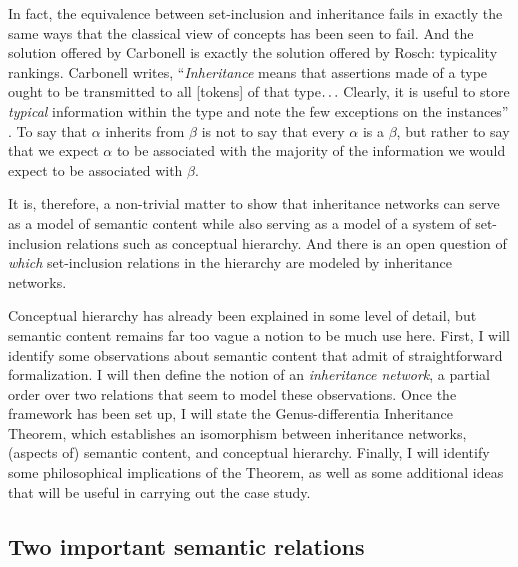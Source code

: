In fact, the equivalence between set-inclusion and inheritance fails in exactly the same ways that the classical view of concepts has been seen to fail. And the solution offered by Carbonell is exactly the solution offered by Rosch: typicality rankings. Carbonell writes, ``\emph{Inheritance} means that assertions made of a type ought to be transmitted to all [tokens] of that type$\mathellipsis$ Clearly, it is useful to store \emph{typical} information within the type and note the few exceptions on the instances'' \cite{carbonell_default_1980}. To say that $\alpha$ inherits from $\beta$ is not to say that every $\alpha$ is a $\beta$, but rather to say that we expect $\alpha$ to be associated with the majority of the information we would expect to be associated with $\beta$.

It is, therefore, a non-trivial matter to show that inheritance networks can serve as a model of semantic content while also serving as a model of a system of set-inclusion relations such as conceptual hierarchy. And there is an open question of \emph{which} set-inclusion relations in the hierarchy are modeled by inheritance networks.

Conceptual hierarchy has already been explained in some level of detail, but semantic content remains far too vague a notion to be much use here. First, I will identify some observations about semantic content that admit of straightforward formalization. I will then define the notion of an \emph{inheritance network}, a partial order over two relations that seem to model these observations. Once the framework has been set up, I will state the Genus-differentia Inheritance Theorem, which establishes an isomorphism between inheritance networks, (aspects of) semantic content, and conceptual hierarchy. Finally, I will identify some philosophical implications of the Theorem, as well as some additional ideas that will be useful in carrying out the case study.

\subsection{Two important semantic relations}

